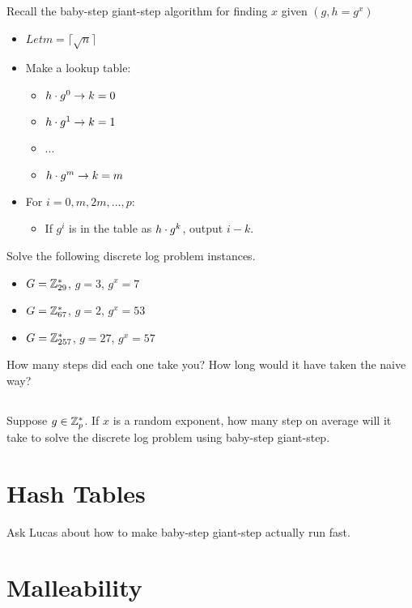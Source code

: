\documentclass[12pt]{article}
\begin{document}
Recall the baby-step giant-step algorithm for finding $x$ given $(g, h = g^x)$

\begin{itemize}
\item $Let m = \lceil \sqrt{n} \rceil$
\item Make a lookup table:
\begin{itemize}
\item $h \cdot g^{0} \to k = 0$
\item $h \cdot g^{1} \to k = 1$
\item ...
\item $h \cdot g^{m} \to k = m$
\end{itemize}
\item For $i = 0, m, 2m, ..., p$:
\begin{itemize}
\item If $g^i$ is in the table as $h \cdot g^k$, output $i - k$.
\end{itemize}

\end{itemize}


Solve the following discrete log problem instances.

\begin{itemize}
\item $G = \mathbb{Z}_{29}^*$, $g=3$, $g^x = 7$ 
\item $G = \mathbb{Z}_{67}^*$, $g=2$, $g^x = 53$ 
\item $G = \mathbb{Z}_{257}^*$, $g=27$, $g^x = 57$ 
\end{itemize}

How many steps did each one take you? How long would it have taken the naive way?

\subsection{}

Suppose $g \in \mathbb{Z}_p^*$. If $x$ is a random exponent, how many step on average will it take to solve the discrete log problem using baby-step giant-step.


\section{Hash Tables}

Ask Lucas about how to make baby-step giant-step actually run fast.

\section{Malleability}
\end{document}
